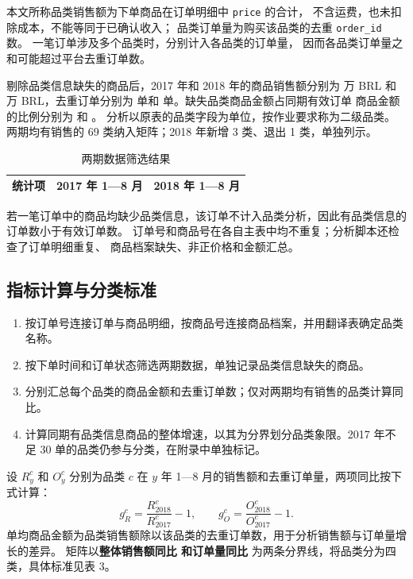 \documentclass[11pt,a4paper]{ctexart}
\begin{document}
本文所称品类销售额为下单商品在订单明细中 \texttt{price} 的合计，
不含运费，也未扣除成本，不能等同于已确认收入；
品类订单量为购买该品类的去重 \texttt{order\_id} 数。
一笔订单涉及多个品类时，分别计入各品类的订单量，
因而各品类订单量之和可能超过平台去重订单数。

剔除品类信息缺失的商品后，2017 年和 2018 年的商品销售额分别为
\SalesSeventeen{} 万 BRL 和 \SalesEighteen{} 万 BRL，去重订单分别为
\OrdersSeventeen{} 单和 \OrdersEighteen{} 单。缺失品类商品金额占同期有效订单
商品金额的比例分别为 \MissingShareSeventeen{} 和 \MissingShareEighteen{}。
分析以原表的品类字段为单位，按作业要求称为二级品类。
两期均有销售的 69 类纳入矩阵；2018 年新增 3 类、退出 1 类，单独列示。

\begin{table}[H]
\centering
\caption{两期数据筛选结果}
\small
\begin{tabular}{lrr}
\toprule
统计项 & 2017 年 1—8 月 & 2018 年 1—8 月 \\
\midrule

\end{tabular}
\end{table}
\noindent 若一笔订单中的商品均缺少品类信息，该订单不计入品类分析，因此有品类信息的订单数小于有效订单数。
订单号和商品号在各自主表中均不重复；分析脚本还检查了订单明细重复、
商品档案缺失、非正价格和金额汇总。

\subsection{指标计算与分类标准}

\begin{enumerate}
\item 按订单号连接订单与商品明细，按商品号连接商品档案，并用翻译表确定品类名称。
\item 按下单时间和订单状态筛选两期数据，单独记录品类信息缺失的商品。
\item 分别汇总每个品类的商品金额和去重订单数；仅对两期均有销售的品类计算同比。
\item 计算同期有品类信息商品的整体增速，以其为分界划分品类象限。2017 年不足 30 单的品类仍参与分类，在附录中单独标记。
\end{enumerate}

设 $R_y^c$ 和 $O_y^c$ 分别为品类 $c$ 在 $y$ 年 1—8 月的销售额和去重订单量，两项同比按下式计算：
\[
g_R^c=\frac{R_{2018}^c}{R_{2017}^c}-1,\qquad
g_O^c=\frac{O_{2018}^c}{O_{2017}^c}-1.
\]
单均商品金额为品类销售额除以该品类的去重订单数，用于分析销售额与订单量增长的差异。
矩阵以\textbf{整体销售额同比 \SalesGrowth{} 和订单量同比 \OrderGrowth{}}
为两条分界线，将品类分为四类，具体标准见表 3。
\end{document}
